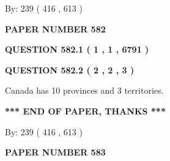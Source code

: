 \documentclass[12pt]{article}
\begin{document}
   
\hspace{1.0in} By: 
 239 ( 416 ,  613 )
   
   
   
   
\newpage 
\setcounter{page}{ 
   582001 } 
   
   
   
   
 {\textbf{ \Large{ PAPER NUMBER  582  }}}
   
   
\vspace{0.2in}
   
   
   
   
   
   
 \vspace{0.2in}
 
 
 
 
   
   
  
\vspace{0.2in}
  
{\textbf{\Large{QUESTION
582.1 
 ( 1 , 1 , 6791 )
}}}
  
  
  
\vspace{0.2in}
  
{\textbf{\Large{QUESTION
582.2 
 ( 2 , 2 , 3 )
}}}
  
  
 
 
\noindent{}
 
 
Canada has 10  provinces and 3 territories.
 
 
 
 
   
   
 \vspace{0.2in}
 
   
   
   
   
\vspace{1.0in} 
{\textbf{\large{ *** END OF PAPER, THANKS *** }}} 
   
   
\hspace{1.0in} By: 
 239 ( 416 ,  613 )
   
   
   
   
\newpage 
\setcounter{page}{ 
   583001 } 
   
   
   
   
 {\textbf{ \Large{ PAPER NUMBER  583  }}}
   
\end{document}
